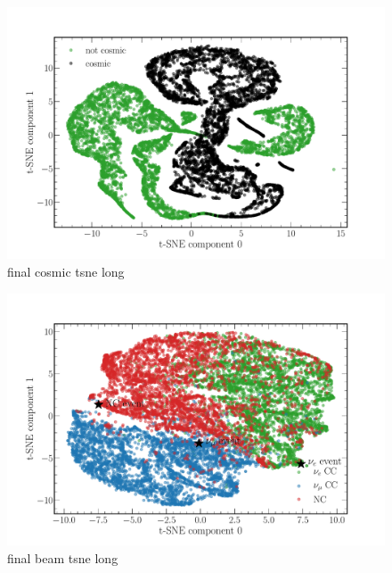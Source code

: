 \begin{figure} %
    \includegraphics[width=\textwidth]{diagrams/6-cvn/chipsnet/final_cosmic_tsne.pdf}
    \caption[final cosmic tsne short]
    {final cosmic tsne long}
    \label{fig:final_cosmic_tsne}
\end{figure} %

\begin{figure} %
    \includegraphics[width=\textwidth]{diagrams/6-cvn/chipsnet/final_beam_tsne.pdf}
    \caption[final beam tsne short]
    {final beam tsne long}
    \label{fig:final_beam_tsne}
\end{figure} %

